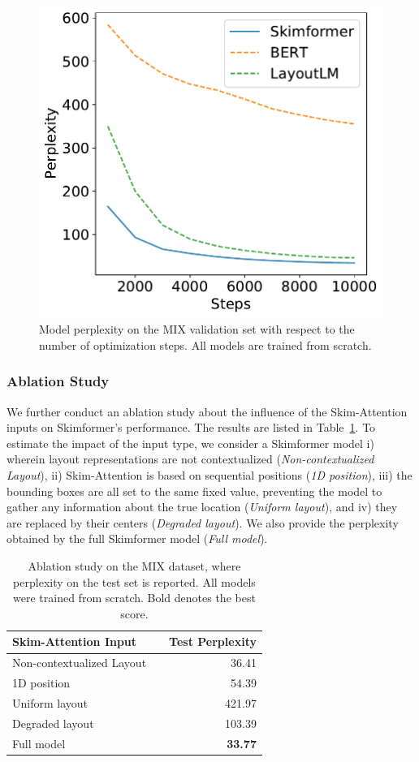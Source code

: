 \begin{figure}
    \centering \small
    \includegraphics[width=.4\textwidth]{images/chapter3/learning_curves-mix-steps10k-clean2.pdf}
    \caption{Model perplexity on the MIX validation set with respect to the number of optimization steps. All models are trained from scratch.}
    \label{fig:pretraining-learning-curves}
\end{figure}

\subsubsection{Ablation Study}

We further conduct an ablation study about the influence of the Skim-Attention inputs on Skimformer's performance. The results are listed in Table~\ref{tab:ablation-study}. To estimate the impact of the input type, we consider a Skimformer model i) wherein layout representations are not contextualized (\textit{Non-contextualized Layout}), ii) Skim-Attention is based on sequential positions (\textit{1D position}), iii) the bounding boxes are all set to the same fixed value, preventing the model to gather any information about the true location (\textit{Uniform layout}), and iv) they are replaced by their centers (\textit{Degraded layout}). We also provide the perplexity obtained by the full Skimformer model (\textit{Full model}).

\begin{table}[t]
\centering \small
\begin{tabular}{lrr}
    \hline
    \textbf{Skim-Attention Input} & &\textbf{Test Perplexity}\\
    \hline
    Non-contextualized Layout  &                            & 36.41 \\
    1D position    &                     & 54.39 \\ 
    Uniform layout   &                   & 421.97 \\
    Degraded layout    &                 & 103.39 \\
    \hline 
    Full model  &             & \textbf{33.77} \\
    \hline
\end{tabular}
\caption{Ablation study on the MIX dataset, where perplexity on the test set is reported. All models were trained from scratch. Bold denotes the best score.}
\label{tab:ablation-study}
\end{table}


